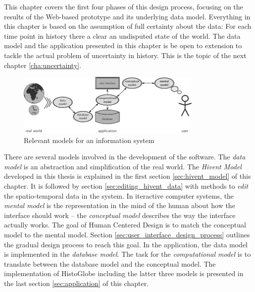 This chapter covers the first four phases of this design process, focusing on the results of the Web-based prototype and its underlying data model. Everything in this chapter is based on the assumption of full certainty about the data: For each time point in history there a clear an undisputed state of the world. The data model and the application presented in this chapter is be open to extension to tackle the actual problem of uncertainty in history. This is the topic of the next chapter \ref{cha:uncertainty}.

\begin{figure}[H]
  \vspace{1.5em}
  \centering
  \includegraphics[width=0.8\textwidth]{graphics/development/models}
  \caption{Relevant models for an information system}
  \label{fig:models}
\end{figure}

There are several models involved in the development of the software. The \emph{data model} is an abstraction and simplification of the real world. The \emph{Hivent Model} developed in this thesis is explained in the first section \ref{sec:hivent_model} of this chapter. It is followed by section \ref{sec:editing_hivent_data} with methods to \emph{edit} the spatio-temporal data in the system. In iteractive computer systems, the \emph{mental model} is the representation in the mind of the human about how the interface should work -- the \emph{conceptual model} describes the way the interface actually works. The goal of Human Centered Design is to match the conceptual model to the mental model. Section \ref{sec:user_interface_design_process} outlines the gradual design process to reach this goal. In the application, the data model is implemented in the \emph{database model}. The task for the \emph{computational model} is to translate between the database model and the conceptual model. The implementation of HistoGlobe including the latter three models is presented in the last section \ref{sec:application} of this chapter.

\newpage







